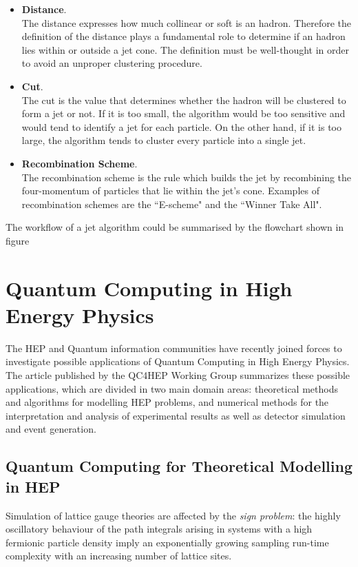 \begin{itemize}
    \item \textbf{Distance}.\\
    The distance expresses how much collinear or soft is an hadron.
    Therefore the definition of the distance plays a fundamental role to determine if an hadron lies within or
    outside a jet cone.
    The definition must be well-thought in order to avoid an unproper clustering procedure.
    \item \textbf{Cut}.\\
    The cut is the value that determines whether the hadron will be clustered to form a jet or not. 
    If it is too small, the algorithm would be too sensitive and would tend to identify a jet for each particle. 
    On the other hand, if it is too large, the algorithm tends to cluster every particle into a single jet.
    \item \textbf{Recombination Scheme}.\\
    The recombination scheme is the rule which builds the jet by recombining the four-momentum of particles
    that lie within the jet's cone.
    Examples of recombination schemes are the “E-scheme" and the “Winner Take All".
\end{itemize}

The workflow of a jet algorithm could be summarised by the flowchart shown in figure 


\section{Quantum Computing in High Energy Physics}

The HEP and Quantum information communities have recently joined forces to investigate possible 
applications of Quantum Computing in High Energy Physics.
The article published by the QC4HEP Working Group summarizes these possible applications, which are divided in 
two main domain areas: theoretical methods and algorithms for modelling HEP problems, and numerical methods 
for the interpretation and analysis of experimental results as well as detector simulation and event generation.

\subsection{Quantum Computing for Theoretical Modelling in HEP}

Simulation of lattice gauge theories are affected by the \textit{sign problem}: the highly oscillatory behaviour of 
the path integrals arising in systems with a high fermionic particle density imply an exponentially growing sampling 
run-time complexity with an increasing number of lattice sites.

